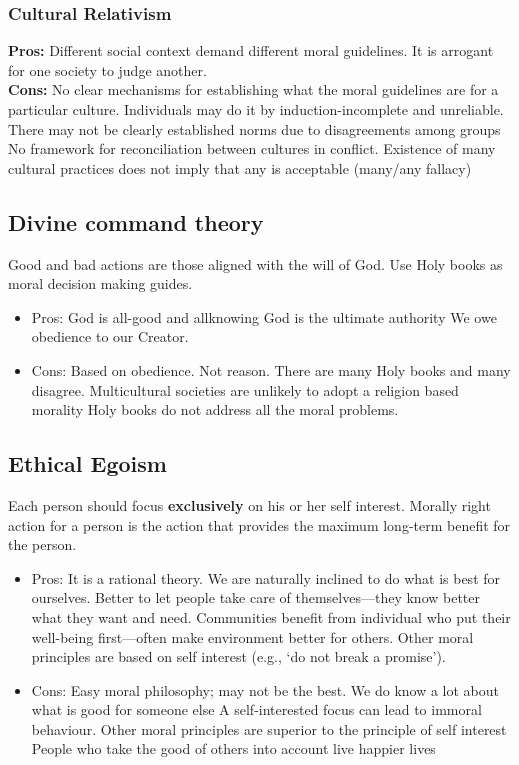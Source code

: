 \documentclass{article}
\begin{document}
\subsubsection{Cultural Relativism}
\begin{flushleft}
  \textbf{Pros:} Different social context demand different moral guidelines. It is arrogant for one society to judge another.\\
  \textbf{Cons:} No clear mechanisms for establishing what the moral guidelines are for a particular culture. Individuals may do it by induction-incomplete and unreliable. There may not be clearly established norms due to disagreements among groups No framework for reconciliation between cultures in conflict. Existence of many cultural practices does not imply that any is acceptable (many/any fallacy)
\end{flushleft}


\subsection{Divine command theory}
\begin{flushleft}
Good and bad actions are those aligned with the will of God. Use Holy books as moral decision making guides. 
\begin{itemize}
  \item Pros: God is all-good and allknowing God is the ultimate authority We owe obedience to our Creator.
  \item Cons: Based on obedience. Not reason. There are many Holy books and many disagree. Multicultural societies are unlikely to adopt a religion based morality Holy books do not address all the moral problems.
\end{itemize}
\end{flushleft}

\pagebreak

\subsection{Ethical Egoism}
\begin{flushleft}
Each person should focus \textbf{exclusively} on his or her self interest. Morally right action for a person is the action that provides the maximum long-term benefit for the person.
\end{flushleft}
\begin{itemize}
  \item Pros: It is a rational theory. We are naturally inclined to do what is best for ourselves. Better to let people take care of themselves—they know better what they want and need. Communities benefit from individual who put their well-being first—often make environment better for others. Other moral principles are based on self interest (e.g., ‘do not break a promise’).
  \item Cons: Easy moral philosophy; may not be the best. We do know a lot about what is good for someone else A self-interested focus can lead to immoral behaviour. Other moral principles are superior to the principle of self interest People who take the good of others into account live happier lives
\end{itemize}
\end{document}
